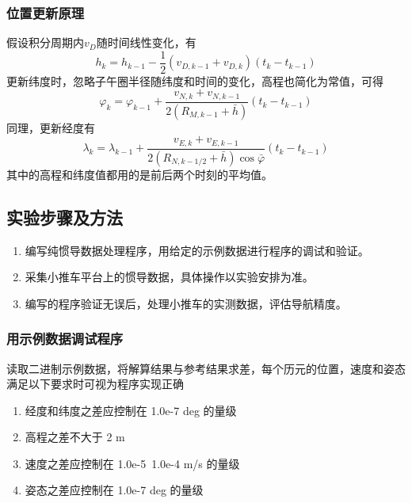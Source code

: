 \documentclass{ctexart}
\begin{document}
\subsubsection{位置更新原理}
假设积分周期内$v_D$随时间线性变化，有
\begin{equation}
h_{k}=h_{k-1}-\frac{1}{2}\left(v_{D, k-1}+v_{D, k}\right)\left(t_{k}-t_{k-1}\right)
\end{equation}
更新纬度时，忽略子午圈半径随纬度和时间的变化，高程也简化为常值，可得
\begin{equation}
\varphi_{k}=\varphi_{k-1}+\frac{v_{N, k}+v_{N, k-1}}{2\left(R_{M, k-1}+\bar{h}\right)}\left(t_{k}-t_{k-1}\right)
\end{equation}
同理，更新经度有
\begin{equation}
\lambda_{k}=\lambda_{k-1}+\frac{v_{E, k}+v_{E, k-1}}{2\left(R_{N, k-1 / 2}+\bar{h}\right) \cos \bar{\varphi}}\left(t_{k}-t_{k-1}\right)
\end{equation}
其中的高程和纬度值都用的是前后两个时刻的平均值。

\subsection{实验步骤及方法}
\begin{enumerate}[(1)]
\item 编写纯惯导数据处理程序，用给定的示例数据进行程序的调试和验证。
\item 采集小推车平台上的惯导数据，具体操作以实验安排为准。
\item 编写的程序验证无误后，处理小推车的实测数据，评估导航精度。
\end{enumerate}
\subsubsection{用示例数据调试程序}
\label{1.4.1}
读取二进制示例数据，将解算结果与参考结果求差，每个历元的位置，速度和姿态满足以下要求时可视为程序实现正确
\begin{enumerate}[*]
\item 经度和纬度之差应控制在 1.0e-7 deg 的量级
\item 高程之差不大于 2 m
\item 速度之差应控制在 1.0e-5~1.0e-4 m/s 的量级
\item 姿态之差应控制在 1.0e-7 deg 的量级
\end{enumerate}
\end{document}
